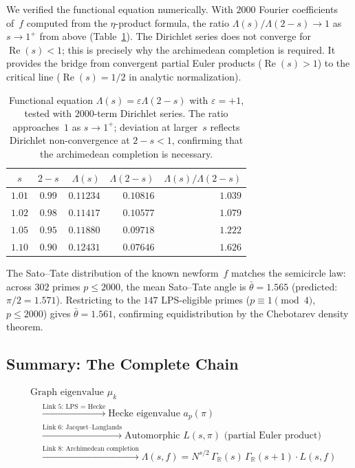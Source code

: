 \documentclass[12pt,reqno]{amsart}
\theoremstyle{plain}
\theoremstyle{definition}
\theoremstyle{remark}
\newcommand{\RR}{\mathbb{R}}
\begin{document}
We verified the functional equation numerically.  With $2000$ Fourier
coefficients of~$f$ computed from the $\eta$-product formula, the ratio
$\Lambda(s)/\Lambda(2-s) \to 1$ as $s \to 1^+$ from above
(Table~\ref{tab:functional_eqn}).  The Dirichlet series does not
converge for $\operatorname{Re}(s) < 1$; this is precisely why the
archimedean completion is required.  It provides the bridge from
convergent partial Euler products ($\operatorname{Re}(s) > 1$) to the
critical line ($\operatorname{Re}(s) = 1/2$ in analytic normalization).

\begin{table}[ht]
\centering
\renewcommand{\arraystretch}{1.1}
\begin{tabular}{ccrrr}
  \toprule
  $s$ & $2-s$ & $\Lambda(s)$ & $\Lambda(2-s)$ & $\Lambda(s)/\Lambda(2-s)$ \\
  \midrule
  $1.01$ & $0.99$ & $0.11234$ & $0.10816$ & $1.039$ \\
  $1.02$ & $0.98$ & $0.11417$ & $0.10577$ & $1.079$ \\
  $1.05$ & $0.95$ & $0.11880$ & $0.09718$ & $1.222$ \\
  $1.10$ & $0.90$ & $0.12431$ & $0.07646$ & $1.626$ \\
  \bottomrule
\end{tabular}
\caption{Functional equation $\Lambda(s) = \varepsilon \Lambda(2-s)$
  with $\varepsilon = +1$, tested with $2000$-term Dirichlet series.
  The ratio approaches~$1$ as $s \to 1^+$; deviation at larger~$s$
  reflects Dirichlet non-convergence at $2 - s < 1$, confirming that
  the archimedean completion is necessary.}
\label{tab:functional_eqn}
\end{table}

The Sato--Tate distribution of the known newform~$f$ matches the
semicircle law: across $302$ primes $p \leq 2000$, the mean
Sato--Tate angle is $\bar\theta = 1.565$ (predicted: $\pi/2 = 1.571$).
Restricting to the $147$ LPS-eligible primes ($p \equiv 1 \pmod{4}$,
$p \leq 2000$) gives $\bar\theta = 1.561$, confirming equidistribution
by the Chebotarev density theorem.


\subsection{Summary: The Complete Chain}

\begin{equation}\label{eq:chain}
  \boxed{
  \begin{aligned}
    &\text{Graph eigenvalue } \mu_k \\
    &\quad\xrightarrow{\text{Link 5: LPS = Hecke}}
    \text{Hecke eigenvalue } a_p(\pi) \\
    &\quad\xrightarrow{\text{Link 6: Jacquet--Langlands}}
    \text{Automorphic } L(s, \pi) \text{ (partial Euler product)} \\
    &\quad\xrightarrow{\text{Link 8: Archimedean completion}}
    \Lambda(s, f) = N^{s/2}\, \Gamma_\RR(s)\, \Gamma_\RR(s{+}1) \cdot L(s, f)
  \end{aligned}
  }
\end{equation}
\end{document}
